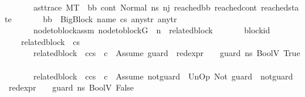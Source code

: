 \begin{isabellebody}
\ \ \ \ \ \ \ ast{\isacharunderscore}{\kern0pt}trace{\isacharcolon}{\kern0pt}\ {\isachardoublequoteopen}M{\isacharcomma}{\kern0pt}{\isasymLambda}{\isacharcomma}{\kern0pt}{\isasymGamma}{\isacharcomma}{\kern0pt}{\isasymOmega}{\isacharcomma}{\kern0pt}T\ {\isasymturnstile}\ {\isacharparenleft}{\kern0pt}bb{\isacharcomma}{\kern0pt}\ cont{}{\isacharcomma}{\kern0pt}\ {\isacharparenleft}{\kern0pt}Normal\ ns{}{\isacharparenright}{\kern0pt}{\isacharparenright}{\kern0pt}\ {\isacharminus}{\kern0pt}n{\isasymlongrightarrow}{\isacharcircum}{\kern0pt}j\ {\isacharparenleft}{\kern0pt}reached{\isacharunderscore}{\kern0pt}bb{\isacharcomma}{\kern0pt}\ reached{\isacharunderscore}{\kern0pt}cont{\isacharcomma}{\kern0pt}\ reached{\isacharunderscore}{\kern0pt}state{\isacharparenright}{\kern0pt}{\isachardoublequoteclose}\isanewline
\ \ \ \ \ \ \ {\isachardoublequoteopen}bb\ {\isacharequal}{\kern0pt}\ {\isacharparenleft}{\kern0pt}BigBlock\ name\ cs{}\ any{\isacharunderscore}{\kern0pt}str\ any{\isacharunderscore}{\kern0pt}tr{\isacharparenright}{\kern0pt}{\isachardoublequoteclose}\isanewline
\ \ \ \ \ \ \ node{\isacharunderscore}{\kern0pt}to{\isacharunderscore}{\kern0pt}block{\isacharunderscore}{\kern0pt}assm{\isacharcolon}{\kern0pt}\ {\isachardoublequoteopen}node{\isacharunderscore}{\kern0pt}to{\isacharunderscore}{\kern0pt}block{\isacharparenleft}{\kern0pt}G{\isacharparenright}{\kern0pt}\ {\isacharbang}{\kern0pt}\ n\ {\isacharequal}{\kern0pt}\ related{\isacharunderscore}{\kern0pt}block{\isachardoublequoteclose}\isanewline
\ \ \ \ \ \ \ block{\isacharunderscore}{\kern0pt}id{\isacharcolon}{\kern0pt}\isanewline
\ \ \ \ {\isachardoublequoteopen}{\isacharparenleft}{\kern0pt}related{\isacharunderscore}{\kern0pt}block\ {\isacharequal}{\kern0pt}\ cs{}{\isacharparenright}{\kern0pt}\ {\isasymor}\ \isanewline
\ \ \ \ \ \ \ {\isacharparenleft}{\kern0pt}related{\isacharunderscore}{\kern0pt}block\ {\isacharequal}{\kern0pt}\ c{\isacharhash}{\kern0pt}cs{}{\isacharparenright}{\kern0pt}\ {\isasymand}\ c\ {\isacharequal}{\kern0pt}\ Assume\ guard\ {\isasymand}\ {\isacharparenleft}{\kern0pt}red{\isacharunderscore}{\kern0pt}expr\ {\isasymLambda}\ {\isasymGamma}\ {\isasymOmega}\ guard\ ns{}\ {\isacharparenleft}{\kern0pt}BoolV\ True{\isacharparenright}{\kern0pt}{\isacharparenright}{\kern0pt}\ {\isasymor}\ \isanewline
\ \ \ \ \ \ \ {\isacharparenleft}{\kern0pt}related{\isacharunderscore}{\kern0pt}block\ {\isacharequal}{\kern0pt}\ c{\isacharhash}{\kern0pt}cs{}{\isacharparenright}{\kern0pt}\ {\isasymand}\ c\ {\isacharequal}{\kern0pt}\ Assume\ not{\isacharunderscore}{\kern0pt}guard\ {\isasymand}\ {\isacharparenleft}{\kern0pt}UnOp\ Not\ guard\ {\isasymsim}\ not{\isacharunderscore}{\kern0pt}guard{\isacharparenright}{\kern0pt}\ {\isasymand}\ {\isacharparenleft}{\kern0pt}red{\isacharunderscore}{\kern0pt}expr\ {\isasymLambda}\ {\isasymGamma}\ {\isasymOmega}\ guard\ ns{}\ {\isacharparenleft}{\kern0pt}BoolV\ False{\isacharparenright}{\kern0pt}{\isacharparenright}{\kern0pt}{\isachardoublequoteclose}\isanewline

\end{isabellebody}
